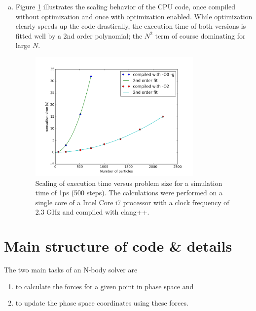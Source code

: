 \documentclass{scrartcl}
\begin{document}
\begin{enumerate}[a)]
    For a problem size of $N=1000$, one integration step takes
    on average 6.86ms (see also Figure \ref{fig:scal}).
    At this problem size, the calculaltion of the forces already 
    dominates strongly, making up 99.5\% of the integration time.
    Obviously, Kernel 2 is the one that ought to be parallelized.

\item Figure \ref{fig:scal} illustrates the scaling behavior of the CPU code,
    once compiled without optimization and once with optimization enabled.
    While optimization clearly speeds up the code drastically,
    the execution time of both versions is fitted well by a 2nd order 
    polynomial; the $N^2$ term of course dominating for large $N$.

\begin{figure}[h]
    \centering
    \includegraphics[width=0.80\textwidth]{images/scaling}
    \caption{Scaling of execution time versus problem size for a simulation
             time of 1ps (500 steps). 
             The calculations were performed on a single core of a Intel Core i7 
             processor with a clock frequency of 2.3 GHz and compiled with clang++.}
    \label{fig:scal}
\end{figure}

\end{enumerate}


\section{Main structure of code \& details}

The two main tasks of an N-body solver are
\begin{enumerate}
    \item to calculate the forces for a given point in phase space and 
    \item to update the phase space coordinates using these forces.
\end{enumerate}
\end{document}
